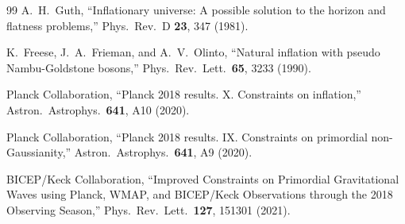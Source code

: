 \documentclass[11pt]{article}
\begin{document}
\begin{thebibliography}{99}
 A.~H.~Guth, ``Inflationary universe: A possible solution to the horizon and flatness problems,'' Phys.\ Rev.\ D \textbf{23}, 347 (1981).

 K.~Freese, J.~A.~Frieman, and A.~V.~Olinto, ``Natural inflation with pseudo Nambu-Goldstone bosons,'' Phys.\ Rev.\ Lett.\ \textbf{65}, 3233 (1990).

 Planck Collaboration, ``Planck 2018 results. X. Constraints on inflation,'' Astron.\ Astrophys.\ \textbf{641}, A10 (2020).

 Planck Collaboration, ``Planck 2018 results. IX. Constraints on primordial non-Gaussianity,'' Astron.\ Astrophys.\ \textbf{641}, A9 (2020).

 BICEP/Keck Collaboration, ``Improved Constraints on Primordial Gravitational Waves using Planck, WMAP, and BICEP/Keck Observations through the 2018 Observing Season,'' Phys.\ Rev.\ Lett.\ \textbf{127}, 151301 (2021).

\end{thebibliography}
\end{document}
